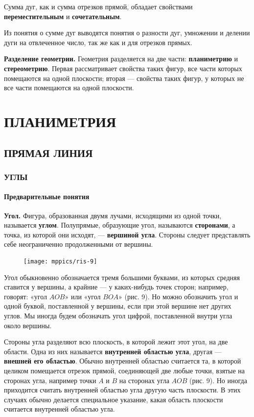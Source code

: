 \documentclass[oneside]{book}
\begin{document}
Сумма дуг, как и сумма отрезков прямой, обладает свойствами \textbf{переместительным} и \textbf{сочетательным}.

Из понятия о сумме дуг выводятся понятия о разности дуг, умножении и делении дуги на отвлеченное число, так же как и для отрезков прямых.


\textbf{Разделение геометрии.}
Геометрия разделяется на две части:
\textbf{планиметрию} и \textbf{стереометрию}.
Первая рассматривает свойства таких фигур, все части которых помещаются на одной плоскости;
вторая — свойства таких фигур, у которых не все части помещаются на одной плоскости.



\part{ПЛАНИМЕТРИЯ}

\chapter{ПРЯМАЯ ЛИНИЯ}


\section{УГЛЫ} 

\subsection*{Предварительные понятия}

\textbf{Угол.}
Фигура, образованная двумя лучами, исходящими из одной точки, называется \textbf{углом}.
Полупрямые, образующие угол, называются \textbf{сторонами}, а точка, из которой они исходят, — \textbf{вершиной угла}.
Стороны следует представлять себе неограниченно продолженными от вершины.

\begin{figure}
\texttt{[image: mppics/ris-9]}
\caption{}
\end{figure}

Угол обыкновенно обозначается тремя большими буквами, из которых средняя ставится у вершины, а крайние — у каких-нибудь точек сторон;
например, говорят:
«угол $AOB$» или «угол $BOA$» (рис. 9).
Но можно обозначить угол и одной буквой, поставленной у вершины, если при этой вершине нет других углов.
Мы иногда будем обозначать угол цифрой, поставленной внутри угла около вершины.

Стороны угла разделяют всю плоскость, в которой лежит этот угол, на две области.
Одна из них называется \textbf{внутренней областью угла}, другая — \textbf{внешней его областью}.
Обычно внутренней областью считается та, в которой целиком помещается отрезок прямой, соединяющей две любые точки, взятые на сторонах угла, например точки $A$ и $B$ на сторонах угла $AOB$ (рис. 9).
Но иногда приходится считать внутренней областью угла другую часть плоскости.
В этих случаях обычно делается специальное указание, какая область плоскости считается внутренней областью угла.
\end{document}
